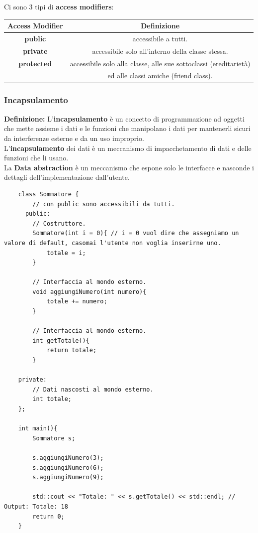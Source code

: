\textsf{\small Ci sono 3 tipi di \textbf{access modifiers}:} \break

\begin{tabular}{|c|c|}
	\hline
	\textbf{Access Modifier} & \textbf{Definizione} \\
	\hline
	\textsf{\small \textbf{public}} & \textsf{\small accessibile a tutti.} \\
	\hline
	\textsf{\small \textbf{private}} & \textsf{\small accessibile solo all'interno della classe stessa.} \\
	\hline
	\textsf{\small \textbf{protected}} & \textsf{\small accessibile solo alla classe, alle sue sottoclassi (ereditarietà)} \\
	\textsf{\small } & \textsf{\small ed alle classi amiche (friend class).} \\
	\hline
\end{tabular}

\subsubsection{Incapsulamento}

\textsf{\small \textbf{Definizione: } L'\textbf{incapsulamento} è un concetto di programmazione ad oggetti che mette assieme i dati e le funzioni che manipolano i dati per mantenerli sicuri da interferenze esterne e da un uso improprio.} \\

\textsf{\small L'\textbf{incapsulamento} dei dati è un meccanismo di impacchetamento di dati e delle funzioni che li usano. } \\

\textsf{\small La \textbf{Data abstraction} è un meccanismo che espone solo le interfacce e nasconde  i dettagli dell'implementazione dall'utente.} \break


\begin{lstlisting}
	class Sommatore {
		// con public sono accessibili da tutti.
	  public:
		// Costruttore.
		Sommatore(int i = 0){ // i = 0 vuol dire che assegniamo un valore di default, casomai l'utente non voglia inserirne uno.
			totale = i;
		}
	
		// Interfaccia al mondo esterno.
		void aggiungiNumero(int numero){
			totale += numero;
		}
	
		// Interfaccia al mondo esterno.
		int getTotale(){
			return totale;
		}
	
	private:
		// Dati nascosti al mondo esterno.
		int totale;
	};

	int main(){
		Sommatore s;
		
		s.aggiungiNumero(3);
		s.aggiungiNumero(6);
		s.aggiungiNumero(9);
		
		std::cout << "Totale: " << s.getTotale() << std::endl; // Output: Totale: 18
		return 0;
	}
\end{lstlisting}


